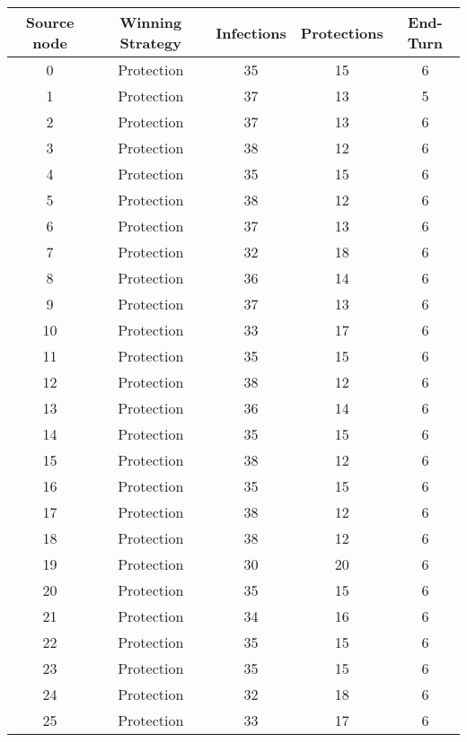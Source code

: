 \documentclass[results.tex]{subfiles}
\begin{document}
\begin{center}
  \begin{tabular}{| c || c | c | c | c |}
    \hline
    {\bfseries Source node} & {\bfseries Winning Strategy} & {\bfseries Infections} & {\bfseries Protections} & {\bfseries End-Turn} \\  %
    \hline\hline
    0 & Protection & 35 & 15 & 6 \\ 
    \hline
    1 & Protection & 37 & 13 & 5 \\ 
    \hline
    2 & Protection & 37 & 13 & 6 \\ 
    \hline
    3 & Protection & 38 & 12 & 6 \\ 
    \hline
    4 & Protection & 35 & 15 & 6 \\ 
    \hline
    5 & Protection & 38 & 12 & 6 \\ 
    \hline
    6 & Protection & 37 & 13 & 6 \\ 
    \hline
    7 & Protection & 32 & 18 & 6 \\ 
    \hline
    8 & Protection & 36 & 14 & 6 \\ 
    \hline
    9 & Protection & 37 & 13 & 6 \\ 
    \hline
    10 & Protection & 33 & 17 & 6 \\ 
    \hline
    11 & Protection & 35 & 15 & 6 \\ 
    \hline
    12 & Protection & 38 & 12 & 6 \\ 
    \hline
    13 & Protection & 36 & 14 & 6 \\ 
    \hline
    14 & Protection & 35 & 15 & 6 \\ 
    \hline
    15 & Protection & 38 & 12 & 6 \\ 
    \hline
    16 & Protection & 35 & 15 & 6 \\ 
    \hline
    17 & Protection & 38 & 12 & 6 \\ 
    \hline
    18 & Protection & 38 & 12 & 6 \\ 
    \hline
    19 & Protection & 30 & 20 & 6 \\ 
    \hline
    20 & Protection & 35 & 15 & 6 \\ 
    \hline
    21 & Protection & 34 & 16 & 6 \\ 
    \hline
    22 & Protection & 35 & 15 & 6 \\ 
    \hline
    23 & Protection & 35 & 15 & 6 \\ 
    \hline
    24 & Protection & 32 & 18 & 6 \\ 
    \hline
    25 & Protection & 33 & 17 & 6 \\ 

\end{tabular}
\end{center}
\end{document}

